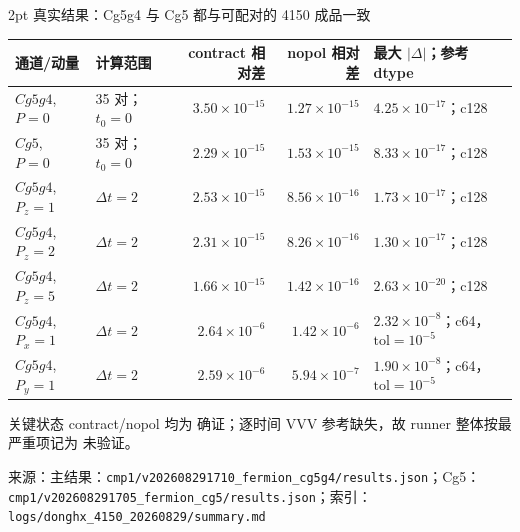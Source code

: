 \documentclass[UTF8,aspectratio=169,11pt]{ctexbeamer}
\newcommand{\source}[1]{\vspace{0.05em}\par{\raggedright\scriptsize\color{muted}来源：#1\par}}
\newcommand{\codepath}[1]{\nolinkurl{#1}}
\newcommand{\verified}{\textcolor{evidence}{确证}}
\newcommand{\unverified}{\textcolor{warning}{未验证}}
\begin{document}
\begin{frame}[t]{2pt 真实结果：Cg5g4 与 Cg5 都与可配对的 4150 成品一致}
  \footnotesize
  \setlength{\tabcolsep}{2.5pt}
  \renewcommand{\arraystretch}{1.02}
  \begin{tabularx}{0.96\textwidth}{@{}Y Y r r Y@{}}
    \toprule
    通道/动量 & 计算范围 & contract 相对差 & nopol 相对差 & 最大 $|\Delta|$；参考 dtype\\
    \midrule
    $Cg5g4$, $P=0$ & 35 对；$t_0=0$ & $3.50\times10^{-15}$ & $1.27\times10^{-15}$ & $4.25\times10^{-17}$；c128\\
    $Cg5$, $P=0$ & 35 对；$t_0=0$ & $2.29\times10^{-15}$ & $1.53\times10^{-15}$ & $8.33\times10^{-17}$；c128\\
    $Cg5g4$, $P_z=1$ & $\Delta t=2$ & $2.53\times10^{-15}$ & $8.56\times10^{-16}$ & $1.73\times10^{-17}$；c128\\
    $Cg5g4$, $P_z=2$ & $\Delta t=2$ & $2.31\times10^{-15}$ & $8.26\times10^{-16}$ & $1.30\times10^{-17}$；c128\\
    $Cg5g4$, $P_z=5$ & $\Delta t=2$ & $1.66\times10^{-15}$ & $1.42\times10^{-16}$ & $2.63\times10^{-20}$；c128\\
    $Cg5g4$, $P_x=1$ & $\Delta t=2$ & $2.64\times10^{-6}$ & $1.42\times10^{-6}$ & $2.32\times10^{-8}$；c64，$\mathrm{tol}=10^{-5}$\\
    $Cg5g4$, $P_y=1$ & $\Delta t=2$ & $2.59\times10^{-6}$ & $5.94\times10^{-7}$ & $1.90\times10^{-8}$；c64，$\mathrm{tol}=10^{-5}$\\
    \bottomrule
  \end{tabularx}
  \vspace{0.10em}
  \begin{block}{关键状态}
    contract/nopol 均为 \verified；逐时间 VVV 参考缺失，故 runner 整体按最严重项记为 \unverified。
  \end{block}
  \source{主结果：\codepath{cmp1/v202608291710_fermion_cg5g4/results.json}；Cg5：\codepath{cmp1/v202608291705_fermion_cg5/results.json}；索引：\codepath{logs/donghx_4150_20260829/summary.md}}
\end{frame}
\end{document}
